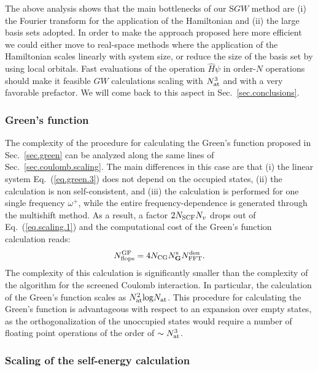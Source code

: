 \documentclass[twocolumn,prb,showpacs,superscriptaddress]{revtex4}
\def\w{\omega}
\def\G{{\bf G}}
\begin{document}
The above analysis shows that the main bottlenecks of our S$GW$ method 
are (i) the Fourier transform for the application of the Hamiltonian and (ii) the large basis sets adopted.
In order to make the approach proposed here more efficient we could either
move to real-space methods where the application of the Hamiltonian scales linearly with system size,\cite{chelikowsky}
or reduce the size of the basis set by using local orbitals.\cite{siesta} 
Fast evaluations of the operation $\hat{H}\psi$ in order-$N$ operations should 
make it feasible $GW$ calculations scaling with $N_{\rm at}^3$ and with a very favorable
prefactor. We will come back to this aspect in Sec.\ \ref{sec.conclusions}.

\subsubsection{Green's function}\label{sec.green.scaling}

The complexity of the procedure for calculating the Green's function proposed
in Sec.\ \ref{sec.green} can be analyzed along the same
lines of Sec.\ \ref{sec.coulomb.scaling}. The main differences in this case are that (i) the linear system
Eq.\ (\ref{eq.green.3}) does not depend on the occupied states,
(ii) the calculation is non self-consistent, and (iii) the calculation is performed
for one single frequency $\w^+$, while the entire frequency-dependence is generated
through the multishift method. As a result, a factor $2 N_{\rm SCF} N_v$ drops out
of Eq.\ (\ref{eq.scaling.1}) and the computational cost of the Green's function
calculation reads:
   \begin{equation}\label{eq.scaling.3}
   N^{\rm GF}_{\rm flops} = 4 N_{\rm CG} N_\G^{\rm s} N^{\rm den}_{\rm FFT}.
   \end{equation}
The complexity of this calculation is significantly smaller than the complexity
of the algorithm for the screened Coulomb interaction. In particular, the
calculation of the Green's function scales as $N_{\rm at}^2 {\rm log} N_{\rm at}$.
This procedure for calculating the Green's function is advantageous
with respect to an expansion over empty states, as the orthogonalization
of the unoccupied states would require a number of floating point operations 
of the order of $\sim N_{\rm at}^3$.

\subsubsection{Scaling of the self-energy calculation}\label{sec.sigma.scaling}
\end{document}

